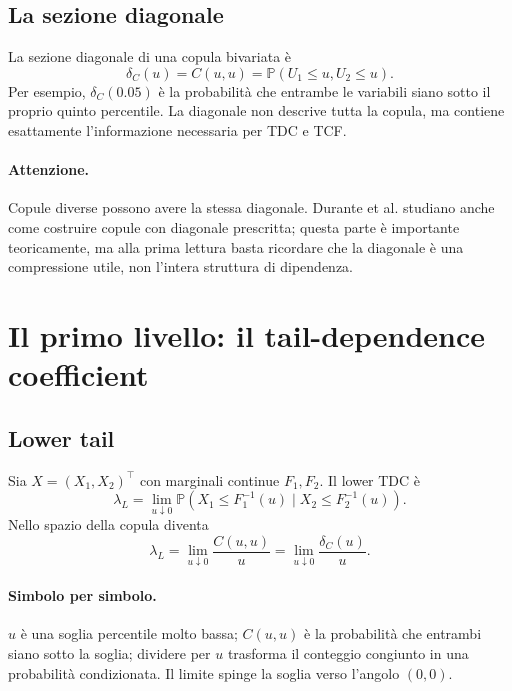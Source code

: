 \documentclass[11pt,a4paper]{article}
\newcommand{\Prob}{\mathbb{P}}
\newcommand{\Attenzione}{\paragraph{Attenzione.}}
\begin{document}
\subsection{La sezione diagonale}

La sezione diagonale di una copula bivariata è
\begin{equation}
 \delta_C(u)=C(u,u)=\Prob(U_1\leq u,U_2\leq u).
 \label{eq:diagonal}
\end{equation}
Per esempio, $\delta_C(0.05)$ è la probabilità che entrambe le variabili siano
sotto il proprio quinto percentile. La diagonale non descrive tutta la copula,
ma contiene esattamente l'informazione necessaria per TDC e TCF.

\Attenzione Copule diverse possono avere la stessa diagonale. Durante et al.
studiano anche come costruire copule con diagonale prescritta; questa parte è
importante teoricamente, ma alla prima lettura basta ricordare che la diagonale
è una compressione utile, non l'intera struttura di dipendenza.

\section{Il primo livello: il tail-dependence coefficient}

\subsection{Lower tail}

Sia $X=(X_1,X_2)^\top$ con marginali continue $F_1,F_2$. Il lower TDC è
\begin{equation}
 \lambda_L=\lim_{u\downarrow0}
 \Prob\!\left(X_1\leq F_1^{-1}(u)\mid
 X_2\leq F_2^{-1}(u)\right).
 \label{eq:lambda-lower-cond}
\end{equation}
Nello spazio della copula diventa
\begin{equation}
 \lambda_L=\lim_{u\downarrow0}\frac{C(u,u)}{u}
 =\lim_{u\downarrow0}\frac{\delta_C(u)}{u}.
 \label{eq:lambda-lower-copula}
\end{equation}

\paragraph{Simbolo per simbolo.}
$u$ è una soglia percentile molto bassa; $C(u,u)$ è la probabilità che
entrambi siano sotto la soglia; dividere per $u$ trasforma il conteggio
congiunto in una probabilità condizionata. Il limite spinge la soglia verso
l'angolo $(0,0)$.
\end{document}
